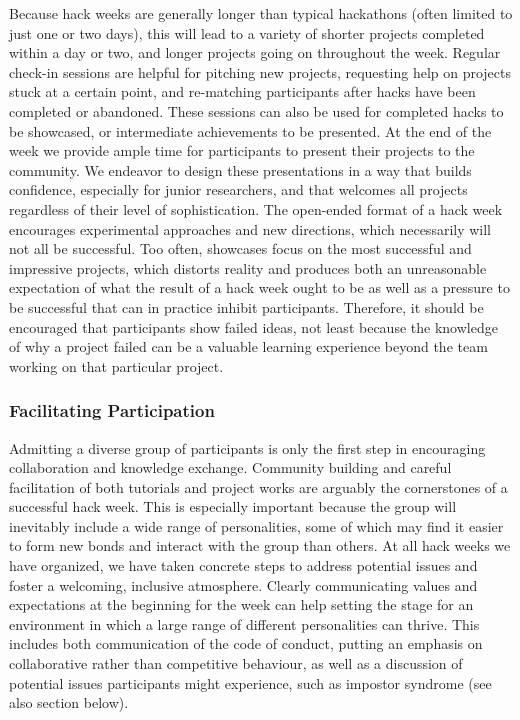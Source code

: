 \documentclass{aastex62}
\begin{document}
Because hack weeks are generally longer than typical hackathons (often limited to just one or two days), this will lead to a variety of shorter projects completed within a day or two, and longer projects going on throughout the week. Regular check-in sessions are helpful for pitching new projects, requesting help on projects stuck at a certain point, and re-matching participants after hacks have been completed or abandoned. These sessions can also be used for completed hacks to be showcased, or intermediate achievements to be presented. At the end of the week we provide ample time for participants to present their projects to the community. We endeavor to design these presentations in a way that builds confidence, especially for junior researchers, and that welcomes all projects regardless of their level of sophistication. The open-ended format of a hack week encourages experimental approaches and new directions, which necessarily will not all be successful. Too often, showcases focus on the most successful and impressive projects, which distorts reality and produces both an unreasonable expectation of what the result of a hack week ought to be as well as a pressure to be successful that can in practice inhibit participants. Therefore, it should be encouraged that participants show failed ideas, not least because the knowledge of why a project failed can be a valuable learning experience beyond the team working on that particular project.

\subsubsection{Facilitating Participation}

Admitting a diverse group of participants is only the first step in encouraging collaboration and knowledge exchange. Community building and careful facilitation of both tutorials and project works are arguably the cornerstones of a successful hack week. This is especially important because the group will inevitably include a wide range of personalities, some of which may find it easier to form new bonds and interact with the group than others. At all hack weeks we have organized, we have taken concrete steps to address potential issues and foster a welcoming, inclusive atmosphere. Clearly communicating values and expectations at the beginning for the week can help setting the stage for an environment in which a large range of different personalities can thrive. This includes both communication of the code of conduct, putting an emphasis on collaborative rather than competitive behaviour, as well as a discussion of potential issues participants might experience, such as impostor syndrome (see also section below).
\end{document}

